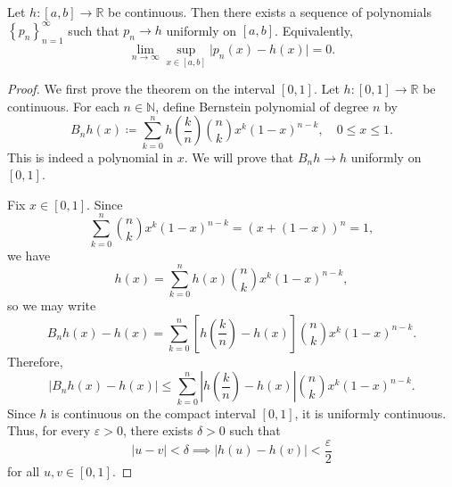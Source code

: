 \begin{theorem}
    Let \(h : [a, b] \to \mathbb{R}\) be continuous. Then there exists a sequence of polynomials \(\left\{ p_n \right\}_{n=1}^{\infty} \) such that \(p_n \to h\) uniformly on \([a, b]\). Equivalently, 
    \[
        \lim_{n \to \infty} \sup _{x \in [a, b]} \vert p_n(x) - h(x) \vert = 0.
    \]    
\end{theorem}

\begin{proof}
    We first prove the theorem on the interval \([0, 1]\). Let \(h : [0, 1] \to \mathbb{R} \) be continuous. For each \(n \in \mathbb{N}\), define Bernstein polynomial of degree \(n\) by 
    \[
        B_n h(x) \coloneqq \sum_{k=0}^n h \left( \frac{k}{n} \right) \binom{n}{k} x^k (1 - x)^{n - k}, \quad 0 \le x \le 1.  
    \]   
    This is indeed a polynomial in \(x\). We will prove that \(B_n h \to h\) uniformly on \([0, 1]\). 

    Fix \(x \in [0, 1]\). Since 
    \[
        \sum_{k=0}^n \binom{n}{k} x^k (1 - x)^{n - k} = (x + (1 - x))^n = 1, 
    \]    
    we have 
    \[
        h(x) = \sum_{k=0}^n h(x) \binom{n}{k} x^k (1 - x)^{n - k}, 
    \]
    so we may write 
    \[
        B_n h(x) - h(x) = \sum_{k=0}^n \left[ h \left( \frac{k}{n} \right) - h(x)  \right] \binom{n}{k} x^k (1 - x)^{n - k}. 
    \]
    Therefore, 
    \[
        \left\vert B_n h(x) - h(x) \right\vert \le \sum_{k=0}^n \left\vert h \left( \frac{k}{n} \right) - h(x)  \right\vert \binom{n}{k} x^k (1 - x)^{n - k}.   
    \]
    Since \(h\) is continuous on the compact interval \([0, 1]\), it is uniformly continuous. Thus, for every \(\varepsilon > 0\), there exists \(\delta > 0\) such that 
    \[
        \vert u - v \vert < \delta \implies \vert h(u) - h(v) \vert < \frac{\varepsilon}{2}
    \]    
    for all \(u, v \in [0, 1]\). 


\end{proof}
